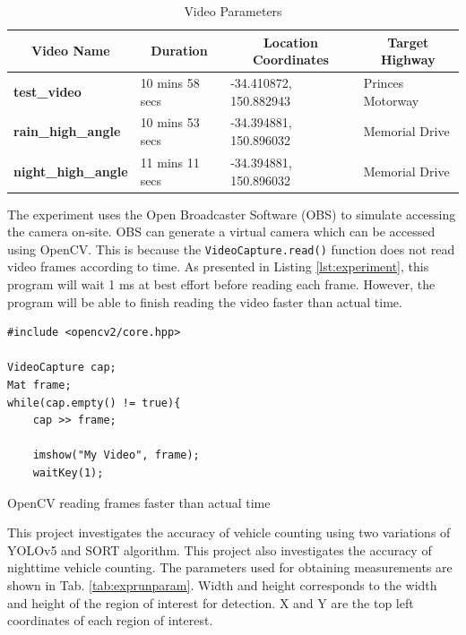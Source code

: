 \documentclass[12pt,a4paper,fleqn]{report}
\begin{document}
\begin{table}[htbp]
\begin{tabular}{|l|l|l|l|}
\hline
\multicolumn{1}{|c|}{\textbf{Video Name}} & \multicolumn{1}{c|}{\textbf{Duration}} & \multicolumn{1}{c|}{\textbf{Location Coordinates}} & \multicolumn{1}{c|}{\textbf{Target Highway}} \\ \hline
\textbf{test\_video} & 10 mins 58 secs & -34.410872, 150.882943 & Princes Motorway \\ \hline
\textbf{rain\_high\_angle} & 10 mins 53 secs & -34.394881, 150.896032 & Memorial Drive \\ \hline
\textbf{night\_high\_angle} & 11 mins 11 secs & -34.394881, 150.896032 & Memorial Drive \\ \hline
\end{tabular}
\caption{Video Parameters}
\label{tab:expvidparam}
\end{table}

The experiment uses the Open Broadcaster Software (OBS) to simulate accessing the camera on-site. 
OBS can generate a virtual camera which can be accessed using OpenCV.
This is because the \texttt{VideoCapture.read()} function does not read video frames according to time.
As presented in Listing \ref{lst:experiment}, this program will wait 1 ms at best effort before reading
each frame.
However, the program will be able to finish reading the video faster than actual time.

\begin{listing}[htbp]
    \centering
{}
\begin{verbatim}
#include <opencv2/core.hpp>

VideoCapture cap;
Mat frame;
while(cap.empty() != true){ 
    cap >> frame; 
    
    imshow("My Video", frame);
    waitKey(1);
\end{verbatim}
\caption{OpenCV reading frames faster than actual time}
\label{lst:experiment}
\end{listing}

This project investigates the accuracy of vehicle counting using two variations of YOLOv5 and SORT
algorithm. 
This project also investigates the accuracy of nighttime vehicle counting. 
The parameters used for obtaining measurements are shown in Tab. \ref{tab:exprunparam}. 
Width and height corresponds to the width and height of the region of interest for detection.
X and Y are the top left coordinates of each region of interest.
\end{document}
